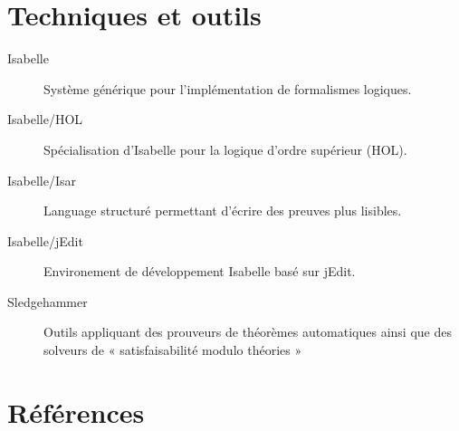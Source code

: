 \documentclass[letterpaper
, twoside
, 12pt
,these
,francais
,creativecommons,hyperref
]{thETS}
\begin{document}
\chapter{Techniques et outils}


\begin{description}
  \item[Isabelle] Système générique pour l'implémentation de formalismes logiques.
  \item[Isabelle/HOL] Spécialisation d'Isabelle pour la logique d'ordre supérieur (\gls{HOL}).
  \item[Isabelle/Isar] Language structuré permettant d'écrire des preuves plus lisibles.
  \item[Isabelle/jEdit] Environement de développement Isabelle basé sur jEdit.
  \item[Sledgehammer] Outils appliquant des prouveurs de théorèmes automatiques ainsi que des
    solveurs de « satisfaisabilité modulo théories »
\end{description}

\chapter{Références}




\begin{conclusion}

\lipsum[1] %

\end{conclusion}


\appendix
\end{document}

